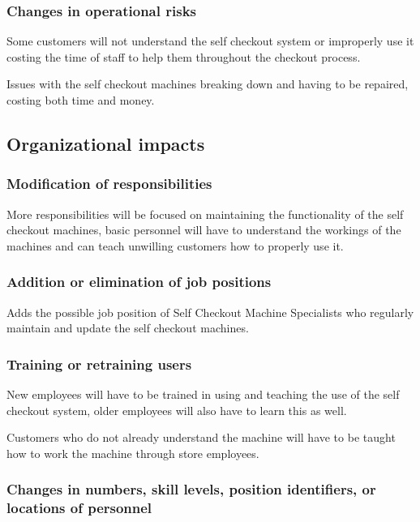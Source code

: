 \subsubsection{Changes in operational risks}
Some customers will not understand the self checkout system or improperly use 
it costing the time of staff to help them throughout 
the checkout process. \newline

Issues with the self checkout machines breaking down and having to be 
repaired, costing both time and money.

\subsection{Organizational impacts}

\subsubsection{Modification of responsibilities}
More responsibilities will be focused on maintaining the functionality of 
the self checkout machines, basic personnel will have to understand the 
workings of the machines and can teach unwilling customers 
how to properly use it.

\subsubsection{Addition or elimination of job positions}
Adds the possible job position of Self Checkout Machine Specialists who 
regularly maintain and update the self checkout machines.

\subsubsection{Training or retraining users}
New employees will have to be trained in using and teaching the use of the 
self checkout system, older employees will also 
have to learn this as well. \newline

Customers who do not already understand the machine will have to be taught 
how to work the machine through store employees.

\subsubsection{Changes in numbers, skill levels, position identifiers, or 
locations of personnel}


